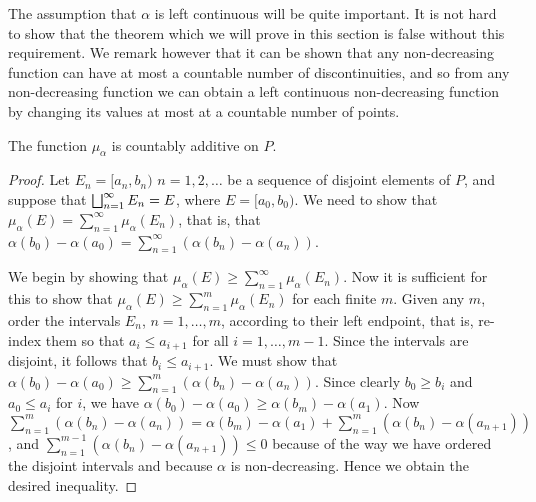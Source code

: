 The assumption that $\alpha$ is left continuous will be quite important. It is not hard to show that the theorem which we will prove in this section is false without this requirement. We remark however that it can be shown that any non-decreasing function can have at most a countable number of discontinuities, and so from any non-decreasing function we can obtain a left continuous non-decreasing function by changing its values at most at a countable number of points.

\begin{theorem}
\label{thm:stieltjes sigma additive}
The function $\mu_\alpha$ is countably additive on $P$.
\end{theorem}

\begin{proof}
Let $E_n=[a_n, b_n)$ $n=1, 2, \dots$ be a sequence of disjoint elements of $P$, and suppose that $\bigsqcup_{n=1}^\infty E_n=E$, where $E=[a_0, b_0)$. We need to show that $\mu_\alpha(E)=\sum_{n=1}^\infty\mu_\alpha(E_n)$, that is, that $\alpha(b_0)-\alpha(a_0)=\sum_{n=1}^\infty(\alpha(b_n)-\alpha(a_n))$.

We begin by showing that $\mu_\alpha(E)\geq\sum_{n=1}^\infty\mu_\alpha(E_n)$. Now it is sufficient for this to show that $\mu_\alpha(E)\geq\sum_{n=1}^m\mu_\alpha(E_n)$ for each finite $m$. Given any $m$, order the intervals $E_n$, $n=1,\dots,m$, according to their left endpoint, that is, re-index them so that $a_i\leq a_{i+1}$ for all $i=1, \dots, m-1$. Since the intervals are disjoint, it follows that $b_i \leq a_{i+1}$. We must show that $\alpha(b_0)-\alpha(a_0) \geq \sum_{n=1}^m(\alpha(b_n)-\alpha(a_n))$. Since clearly $b_0 \geq b_i$ and $a_0 \leq a_i$ for $i$, we have $\alpha(b_0)-\alpha(a_0)\geq\alpha(b_m)-\alpha(a_1)$. Now $\sum_{n=1}^m(\alpha(b_n)-\alpha(a_n))=\alpha(b_m)-\alpha(a_1)+\sum_{n=1}^m(\alpha(b_n)-\alpha(a_{n+1}))$, and $\sum_{n=1}^{m-1}(\alpha(b_n)-\alpha(a_{n+1})) \leq 0$ because of the way we have ordered the disjoint intervals and because $\alpha$ is non-decreasing. Hence we obtain the desired inequality.


\end{proof}
